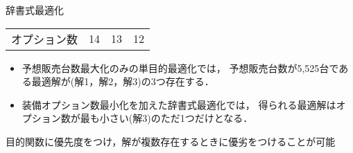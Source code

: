 \documentclass[dvipdfmx, 11pt]{beamer}
\begin{document}
\begin{frame}{辞書式最適化}
\begin{exampleblock}{}
\begin{tabular}{l|l|c|c|c||c|c|c||c|c|c}
    \multicolumn{2}{l|}{オプション数}  & \multicolumn{3}{c||}{14} & \multicolumn{3}{c||}{13}  &\multicolumn{3}{c}{12}\\ 
  \end{tabular}
 \end{exampleblock}
 \begin{itemize}
  \item 予想販売台数最大化のみの単目的最適化では，
	予想販売台数が5,525台である最適解が(解1，解2，解3)の3つ存在する．
  \item 装備オプション数最小化を加えた辞書式最適化では，
	得られる最適解はオプション数が最も小さい(解3)のただ1つだけとなる．
 \end{itemize}
 \begin{alertblock}{}
  目的関数に優先度をつけ，解が複数存在するときに優劣をつけることが可能
 \end{alertblock}
\end{frame}
\end{document}
